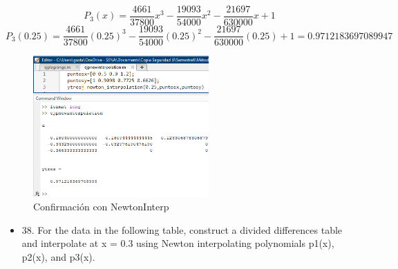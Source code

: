 \documentclass{article}
\begin{document}
\begin{equation*}
    P_3(x) =\frac{4661}{37800}x^{3}-\frac{19093}{54000}x^{2}-\frac{21697}{630000}x+1
\end{equation*}
\begin{equation*}
    P_3(0.25) =\frac{4661}{37800}(0.25)^{3}-\frac{19093}{54000}(0.25)^{2}-\frac{21697}{630000}(0.25)+1= \boxed{0.9712183697089947}
\end{equation*}

\begin{figure}[H]
    \centering
    \includegraphics[width=0.6\textwidth]{37a.png}
    \caption{Confirmación con NewtonInterp}
\end{figure}
\newpage
\begin{itemize}
    \item 38. For the data in the following table, construct a divided differences
          table and interpolate at x = 0.3 using Newton interpolating
          polynomials p1(x), p2(x), and p3(x).
\end{itemize}
\end{document}
